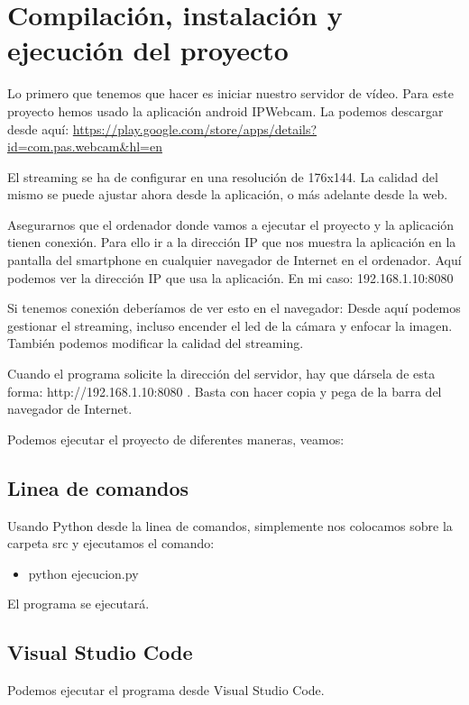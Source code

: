 
\section{Compilación, instalación y ejecución del proyecto}
Lo primero que tenemos que hacer es iniciar nuestro servidor de vídeo. Para este proyecto hemos usado la aplicación android IPWebcam. La podemos descargar desde aquí:
\url{https://play.google.com/store/apps/details?id=com.pas.webcam&hl=en}

El streaming se ha de configurar en una resolución de 176x144. La calidad del mismo se puede ajustar ahora desde la aplicación, o más adelante desde la web.

Asegurarnos que el ordenador donde vamos a ejecutar el proyecto y la aplicación tienen conexión. Para ello ir a la dirección IP que nos muestra la aplicación en la pantalla del smartphone en cualquier navegador de Internet en el ordenador. 
Aquí podemos ver la dirección IP que usa la aplicación. En mi caso: 192.168.1.10:8080

Si tenemos conexión deberíamos de ver esto en el navegador:
Desde aquí podemos gestionar el streaming, incluso encender el led de la cámara y enfocar la imagen.
También podemos modificar la calidad del streaming.

Cuando el programa solicite la dirección del servidor, hay que dársela de esta forma: http://192.168.1.10:8080 .
Basta con hacer copia y pega de la barra del navegador de Internet.

Podemos ejecutar el proyecto de diferentes maneras, veamos:

\subsection{Linea de comandos}
Usando Python desde la linea de comandos, simplemente nos colocamos sobre la carpeta src y ejecutamos el comando:
\begin{itemize}
	\item python ejecucion.py
\end{itemize}

El programa se ejecutará.

\subsection{Visual Studio Code}
Podemos ejecutar el programa desde Visual Studio Code.

